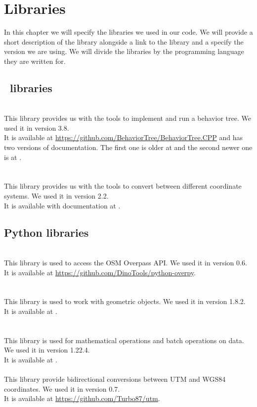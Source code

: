 \chapter{Libraries}
\label{sec:libraries}
    In this chapter we will specify the libraries we used in our code. We will provide a short description of the library alongside a link to the library and a specify the version we are using. We will divide the libraries by the programming language they are written for.

    \section{\CC\ libraries}
        \\
            This library provides us with the tools to implement and run a behavior tree. We used it in version 3.8.\\
            It is available at \url{https://github.com/BehaviorTree/BehaviorTree.CPP} and has two versions of documentation. The first one is older at \cite{BT_docs} and the second newer one is at \cite{BT_docs_new}.\\\\
        \\
            This library provides us with the tools to convert between different coordinate systems. We used it in version 2.2.\\
            It is available with documentation at \cite{GeographicLib}.

    \section{Python libraries}
        \\
            This library is used to access the OSM Overpass API. We used it in version 0.6.\\
            It is available at \url{https://github.com/DinoTools/python-overpy}.\\\\
        \\
            This library is used to work with geometric objects. We used it in version 1.8.2.\\
            It is available at \cite{shapely}.\\\\
        \\
            This library is used for mathematical operations and batch operations on data. We used it in version 1.22.4.\\
            It is available at \cite{numpy}.\\
        \\
            This library provide bidirectional conversions between UTM and WGS84 coordinates. We used it in version 0.7.\\
            It is available at \url{https://github.com/Turbo87/utm}.
